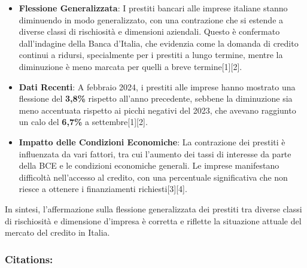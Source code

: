 \documentclass[
  letterpaper,
  DIV=11,
  numbers=noendperiod]{scrartcl}
\begin{document}
\begin{itemize}
\item
  \textbf{Flessione Generalizzata}: I prestiti bancari alle imprese
  italiane stanno diminuendo in modo generalizzato, con una contrazione
  che si estende a diverse classi di rischiosità e dimensioni aziendali.
  Questo è confermato dall'indagine della Banca d'Italia, che evidenzia
  come la domanda di credito continui a ridursi, specialmente per i
  prestiti a lungo termine, mentre la diminuzione è meno marcata per
  quelli a breve termine{[}1{]}{[}2{]}.
\item
  \textbf{Dati Recenti}: A febbraio 2024, i prestiti alle imprese hanno
  mostrato una flessione del \textbf{3,8\%} rispetto all'anno
  precedente, sebbene la diminuzione sia meno accentuata rispetto ai
  picchi negativi del 2023, che avevano raggiunto un calo del
  \textbf{6,7\%} a settembre{[}1{]}{[}2{]}.
\item
  \textbf{Impatto delle Condizioni Economiche}: La contrazione dei
  prestiti è influenzata da vari fattori, tra cui l'aumento dei tassi di
  interesse da parte della BCE e le condizioni economiche generali. Le
  imprese manifestano difficoltà nell'accesso al credito, con una
  percentuale significativa che non riesce a ottenere i finanziamenti
  richiesti{[}3{]}{[}4{]}.
\end{itemize}

\begin{tcolorbox}[enhanced jigsaw, coltitle=black, colbacktitle=quarto-callout-warning-color!10!white, bottomtitle=1mm, colback=white, bottomrule=.15mm, breakable, arc=.35mm, opacitybacktitle=0.6, toprule=.15mm, left=2mm, colframe=quarto-callout-warning-color-frame, title=\textcolor{quarto-callout-warning-color}{\faExclamationTriangle}\hspace{0.5em}{Conclusione}, titlerule=0mm, toptitle=1mm, rightrule=.15mm, leftrule=.75mm, opacityback=0]

In sintesi, l'affermazione sulla flessione generalizzata dei prestiti
tra diverse classi di rischiosità e dimensione d'impresa è corretta e
riflette la situazione attuale del mercato del credito in Italia.

\end{tcolorbox}

\subsubsection{Citations:}\label{citations-3}
\end{document}
